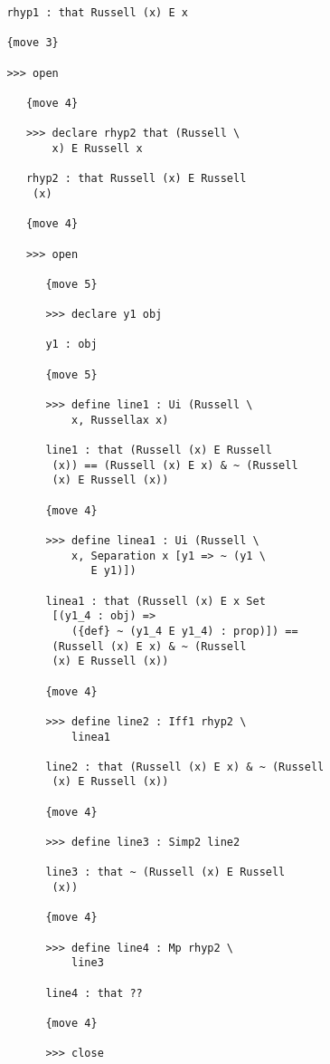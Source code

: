 \documentclass[12pt]{article}
\begin{document}
\begin{verbatim}
         rhyp1 : that Russell (x) E x

         {move 3}

         >>> open

            {move 4}

            >>> declare rhyp2 that (Russell \
                x) E Russell x

            rhyp2 : that Russell (x) E Russell 
             (x)

            {move 4}

            >>> open

               {move 5}

               >>> declare y1 obj

               y1 : obj

               {move 5}

               >>> define line1 : Ui (Russell \
                   x, Russellax x)

               line1 : that (Russell (x) E Russell 
                (x)) == (Russell (x) E x) & ~ (Russell 
                (x) E Russell (x))

               {move 4}

               >>> define linea1 : Ui (Russell \
                   x, Separation x [y1 => ~ (y1 \
                      E y1)])

               linea1 : that (Russell (x) E x Set 
                [(y1_4 : obj) => 
                   ({def} ~ (y1_4 E y1_4) : prop)]) == 
                (Russell (x) E x) & ~ (Russell 
                (x) E Russell (x))

               {move 4}

               >>> define line2 : Iff1 rhyp2 \
                   linea1

               line2 : that (Russell (x) E x) & ~ (Russell 
                (x) E Russell (x))

               {move 4}

               >>> define line3 : Simp2 line2

               line3 : that ~ (Russell (x) E Russell 
                (x))

               {move 4}

               >>> define line4 : Mp rhyp2 \
                   line3

               line4 : that ??

               {move 4}

               >>> close


\end{verbatim}
\end{document}

